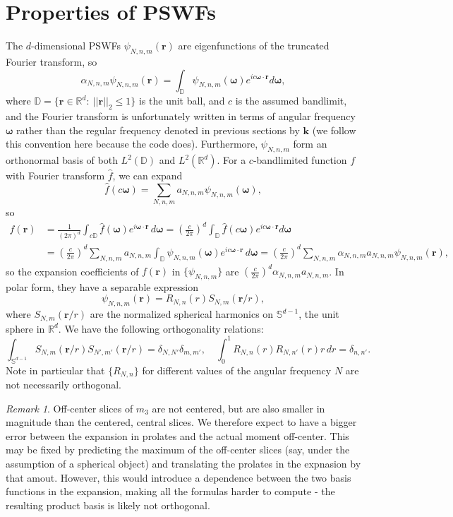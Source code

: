 \documentclass{amsart}
\theoremstyle{definition}
\theoremstyle{remark}
\newtheorem{remark}[theorem]{Remark}
\numberwithin{equation}{section}
\newcommand{\rr}{\mathbf{r}}
\newcommand{\kk}{\mathbf{k}}
\newcommand{\RR}{\mathbb{R}}
\newcommand{\DD}{\mathbb{D}}
\begin{document}
\section{Properties of PSWFs}\label{sec:PSWFs_props}
The $d$-dimensional PSWFs $\psi_{N,n,m}(\rr)$ are eigenfunctions of the truncated Fourier transform, so
\[ \alpha_{N,n,m}\psi_{N,n,m}(\rr) = \int_{\DD}\psi_{N,n,m}(\bm\omega)e^{ic\bm{\omega}\cdot\rr}d\bm\omega,\]
where $\DD=\{\rr\in\RR^d:\ ||\rr||_2\leq 1\}$ is the unit ball, and $c$ is the assumed bandlimit, and the Fourier transform is unfortunately written in terms of angular frequency $\bm\omega$ rather than the regular frequency denoted in previous sections by $\kk$ (we follow this convention here because the code does). Furthermore, $\psi_{N,n,m}$ form an orthonormal basis of both $L^2(\DD)$ and $L^2(\RR^d)$. For a $c$-bandlimited function $f$ with Fourier transform $\widehat f$, we can expand
\[ \widehat f(c\bm\omega) = \sum_{N,n,m}a_{N,n,m}\psi_{N,n,m}(\bm\omega),\]
so
\[\begin{aligned} f(\rr) &= \frac{1}{(2\pi)^d}\int_{c\DD}\widehat f(\bm\omega)e^{i \bm\omega\cdot\rr}\,d\bm\omega = \left(\frac{c}{2\pi}\right)^d\int_{\DD}\widehat f(c\bm\omega)e^{i c\bm\omega\cdot\rr}d\bm\omega\\ 
&= \left(\frac{c}{2\pi}\right)^d\sum_{N,n,m}a_{N,n,m}\int_{\DD}\psi_{N,n,m}(\bm\omega)e^{i c\bm\omega\cdot\rr}\, d\bm\omega = \left(\frac{c}{2\pi}\right)^d\sum_{N,n,m}\alpha_{N,n,m}a_{N,n,m}\psi_{N,n,m}(\rr),\end{aligned}\]
so the expansion coefficients of $f(\rr)$ in $\{\psi_{N,n,m}\}$ are $\left(\frac{c}{2\pi}\right)^d\alpha_{N,n,m}a_{N,n,m}$. In polar form, they have a separable expression
\[ \psi_{N,n,m}(\rr) = R_{N,n}(r)S_{N,m}(\rr/r),\]
where $S_{N,m}(\rr/r)$ are the normalized spherical harmonics on $\mathbb{S}^{d-1}$, the unit sphere in $\RR^d$. We have the following orthogonality relations:
\[ \int_{\mathbb{S}^{d-1}}S_{N,m}(\rr/r)S_{N',m'}(\rr/r) = \delta_{N,N'}\delta_{m,m'},\quad \int_0^1R_{N,n}(r)R_{N,n'}(r)r\, dr = \delta_{n,n'}.\]
Note in particular that $\{R_{N,n}\}$ for different values of the angular frequency $N$ are not necessarily orthogonal.

\begin{remark}
Off-center slices of $m_3$ are not centered, but are also smaller in magnitude than the centered, central slices. We therefore expect to have a bigger error between the expansion in prolates and the actual moment off-center. This may be fixed by predicting the maximum of the off-center slices (say, under the assumption of a spherical object) and translating the prolates in the expnasion by that amout. However, this would introduce a dependence between the two basis functions in the expansion, making all the formulas harder to compute - the resulting product basis is likely not orthogonal.
\end{remark}
\end{document}
